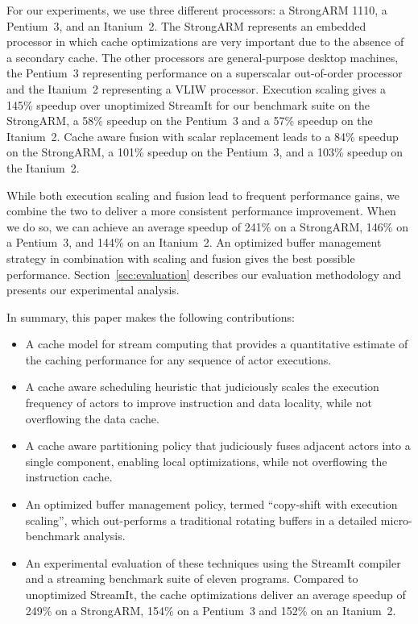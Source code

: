 For our experiments, we use three different processors: a StrongARM
1110, a Pentium~3, and an Itanium~2.  The StrongARM represents an
embedded processor in which cache optimizations are very important due
to the absence of a secondary cache.  The other processors are
general-purpose desktop machines, the Pentium~3 representing
performance on a superscalar out-of-order processor and the Itanium~2
representing a VLIW processor.  Execution scaling gives a 145\%
speedup over unoptimized StreamIt for our benchmark suite on the
StrongARM, a 58\% speedup on the Pentium~3 and a 57\% speedup on the
Itanium~2. Cache aware fusion with scalar replacement leads to a 84\%
speedup on the StrongARM, a 101\% speedup on the Pentium~3, and a
103\% speedup on the Itanium~2.

While both execution scaling and fusion lead to frequent performance
gains, we combine the two to deliver a more consistent performance
improvement. When we do so, we can achieve an average speedup of 241\%
on a StrongARM, 146\% on a Pentium~3, and 144\% on 
an Itanium~2. An optimized buffer management strategy in
combination with scaling and fusion gives the best possible performance.
Section~\ref{sec:evaluation} describes our evaluation
methodology and presents our experimental analysis.

In summary, this paper makes the following contributions:
\begin{itemize}
\item A cache model for stream computing that provides a quantitative
estimate of the caching performance for any sequence of actor
executions.
\item A cache aware scheduling heuristic that judiciously scales the
execution frequency of actors to improve instruction and data locality,
while not overflowing the data cache.
\item A cache aware partitioning policy that judiciously fuses
adjacent actors into a single component, enabling local optimizations,
while not overflowing the instruction cache.
\item An optimized buffer management policy, termed ``copy-shift with
execution scaling'', which out-performs a traditional rotating buffers
in a detailed micro-benchmark analysis.
\item An experimental evaluation of these techniques using the
StreamIt compiler and a streaming benchmark suite of eleven programs.
Compared to unoptimized StreamIt, the cache optimizations deliver an
average speedup of 249\% on a StrongARM, 154\% on a Pentium~3 and
152\% on an Itanium~2.
\end{itemize}

